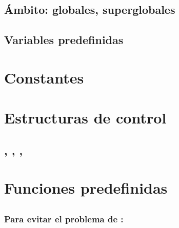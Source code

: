 \documentclass[a4paper,11pt,spanish]{sphinxmanual}
\begin{document}
\subsection{Ámbito: globales, superglobales}
\label{\detokenize{php:ambito-globales-superglobales}}

\subsection{Variables predefinidas}
\label{\detokenize{php:variables-predefinidas}}

\section{Constantes}
\label{\detokenize{php:constantes}}

\section{Estructuras de control}
\label{\detokenize{php:estructuras-de-control}}

\subsection{, , , }
\label{\detokenize{php:require-require-once-include-include-once}}

\section{Funciones predefinidas}
\label{\detokenize{php:funciones-predefinidas}}

\subsection{}
\label{\detokenize{php:isset}}

\subsection{}
\label{\detokenize{php:empty}}

\subsubsection{Para evitar el problema de :}
\label{\detokenize{php:para-evitar-el-problema-de-empty-0-true}}
\begin{sphinxVerbatim}[commandchars=\\\{\}]
 
       
\end{sphinxVerbatim}
\end{document}

